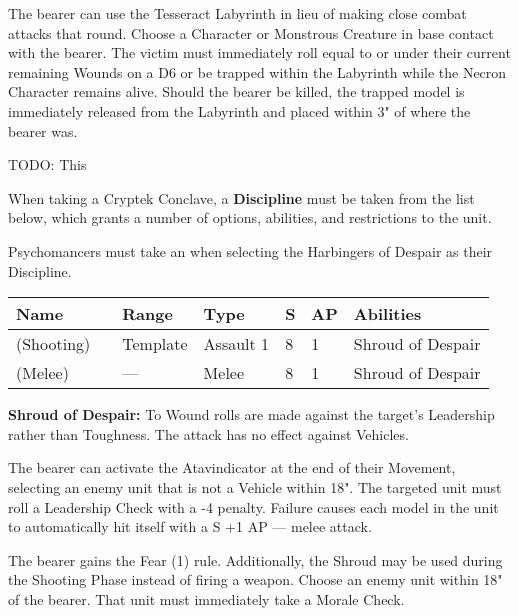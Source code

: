 The bearer can use the Tesseract Labyrinth in lieu of making close combat attacks that round. Choose a Character or Monstrous Creature in base contact with the bearer. The victim must immediately roll equal to or under their current remaining Wounds on a D6 or be trapped within the Labyrinth while the Necron Character remains alive. Should the bearer be killed, the trapped model is immediately released from the Labyrinth and placed within 3" of where the bearer was.


 \label{Artefacts of the Aeons}

TODO: This


When taking a Cryptek Conclave, a \textbf{Discipline} must be taken from the list below, which grants a number of options, abilities, and restrictions to the unit.


Psychomancers must take an  when selecting the Harbingers of Despair as their Discipline.

\label{Abyssal Staff}
\noindent
\begin{tabular}{||m{130pt} m{10pt} m{31pt} m{55pt} m{12pt} m{12pt} m{210pt}||}
	\hline
	Name & & Range & Type & S & AP & Abilities \\
	\hline
	\quickref{Abyssal Staff} (Shooting) & & Template & Assault 1 & 8 & 1 & Shroud of Despair \\
	\quickref{Abyssal Staff} (Melee) & & — & Melee & 8 & 1 & Shroud of Despair \\
	\hline
\end{tabular}

\textbf{Shroud of Despair:} To Wound rolls are made against the target's Leadership rather than Toughness. The attack has no effect against Vehicles.


The bearer can activate the Atavindicator at the end of their Movement, selecting an enemy unit that is not a Vehicle within 18". The targeted unit must roll a Leadership Check with a -4 penalty. Failure causes each model in the unit to automatically hit itself with a S +1 AP — melee attack.


The bearer gains the Fear (1) rule. Additionally, the Shroud may be used during the Shooting Phase instead of firing a weapon. Choose an enemy unit within 18" of the bearer. That unit must immediately take a Morale Check.

